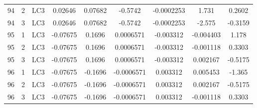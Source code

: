 \documentclass{article}%
\begin{document}
\begin{longtable}{| c c c | c c c c c c |}
94&2&LC3&0.02646&0.07682&{-}0.5742&{-}0.0002253&1.731&0.2602\\%
94&3&LC3&0.02646&0.07682&{-}0.5742&{-}0.0002253&{-}2.575&{-}0.3159\\%
95&1&LC3&{-}0.07675&0.1696&0.0006571&{-}0.003312&{-}0.004403&1.178\\%
95&2&LC3&{-}0.07675&0.1696&0.0006571&{-}0.003312&{-}0.001118&0.3303\\%
95&3&LC3&{-}0.07675&0.1696&0.0006571&{-}0.003312&0.002167&{-}0.5175\\%
96&1&LC3&{-}0.07675&{-}0.1696&{-}0.0006571&0.003312&0.005453&{-}1.365\\%
96&2&LC3&{-}0.07675&{-}0.1696&{-}0.0006571&0.003312&0.002167&{-}0.5175\\%
96&3&LC3&{-}0.07675&{-}0.1696&{-}0.0006571&0.003312&{-}0.001118&0.3303\\%
\end{longtable}

%
\end{document}
